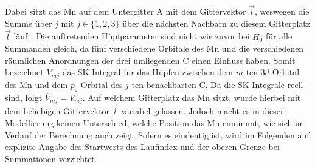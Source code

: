 Dabei sitzt das Mn auf dem Untergitter A mit dem Gittervektor $\vec{l}$, weswegen die Summe über $j$ mit $j \in \{1,2,3 \}$ über die nächsten Nachbarn 
zu diesem Gitterplatz $\vec{l}$ läuft.
Die auftretenden Hüpfparameter sind nicht wie zuvor bei $H_0$ für alle Summanden gleich, da fünf verschiedene Orbitale
des Mn und die verschiedenen räumlichen Anordnungen der drei umliegenden C einen Einfluss haben.
Somit bezeichnet $V_{mj}$ das SK-Integral für das Hüpfen zwischen dem $m$-ten $3d$-Orbital des Mn und dem $p_z$-Orbital des 
$j$-ten benachbarten C.
Da die SK-Integrale reell sind, folgt $\overline{V}_{mj} = V_{mj}$.
Auf welchem Gitterplatz das Mn sitzt, wurde hierbei mit dem beliebigen Gittervektor $\vec{l}$ variabel gelassen.
Jedoch macht es in dieser Modellierung keinen Unterschied, welche Position das Mn einnimmt, wie sich im Verlauf der Berechnung auch zeigt.
Sofern es eindeutig ist, wird im Folgenden auf explizite Angabe des Startwerts des Laufindex und der oberen Grenze bei Summationen verzichtet.
